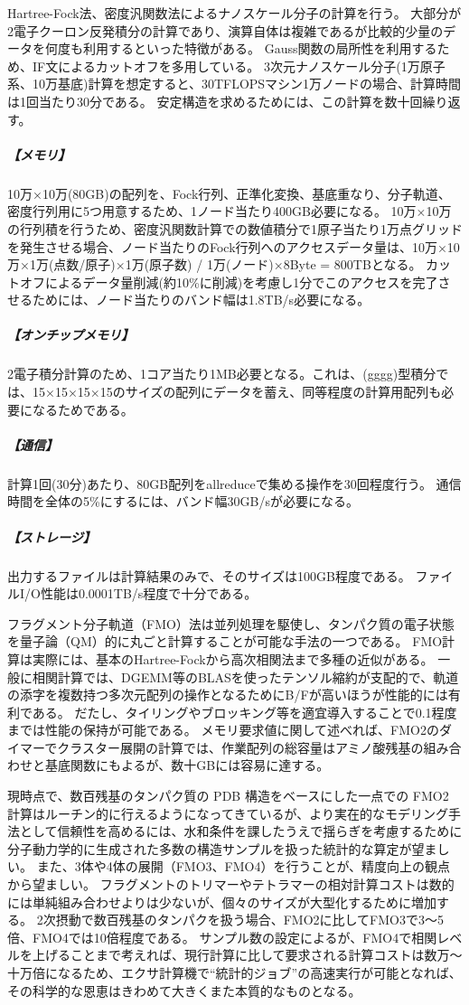 \label{sec:4-2_要求性能_大規模分子軌道法}
Hartree-Fock法、密度汎関数法によるナノスケール分子の計算を行う。
大部分が2電子クーロン反発積分の計算であり、演算自体は複雑であるが比較的少量のデータを何度も利用するといった特徴がある。
Gauss関数の局所性を利用するため、IF文によるカットオフを多用している。
3次元ナノスケール分子(1万原子系、10万基底)計算を想定すると、30TFLOPSマシン1万ノードの場合、計算時間は1回当たり30分である。
安定構造を求めるためには、この計算を数十回繰り返す。

\subparagraph{【メモリ】}
10万×10万(80GB)の配列を、Fock行列、正準化変換、基底重なり、分子軌道、密度行列用に5つ用意するため、1ノード当たり400GB必要になる。
10万×10万の行列積を行うため、密度汎関数計算での数値積分で1原子当たり1万点グリッドを発生させる場合、ノード当たりのFock行列へのアクセスデータ量は、10万×10万×1万(点数/原子)×1万(原子数) / 1万(ノード)×8Byte = 800TBとなる。
カットオフによるデータ量削減(約10\%に削減)を考慮し1分でこのアクセスを完了させるためには、ノード当たりのバンド幅は1.8TB/s必要になる。

\subparagraph{【オンチップメモリ】}
2電子積分計算のため、1コア当たり1MB必要となる。これは、(gg{\textbar}gg)型積分では、15×15×15×15のサイズの配列にデータを蓄え、同等程度の計算用配列も必要になるためである。

\subparagraph{【通信】}
計算1回(30分)あたり、80GB配列をallreduceで集める操作を30回程度行う。
通信時間を全体の5\%にするには、バンド幅30GB/sが必要になる。

\subparagraph{【ストレージ】}
出力するファイルは計算結果のみで、そのサイズは100GB程度である。
ファイルI/O性能は0.0001TB/s程度で十分である。


\label{sec:4-2_要求性能_FMO}
フラグメント分子軌道（FMO）法は並列処理を駆使し、タンパク質の電子状態を量子論（QM）的に丸ごと計算することが可能な手法の一つである。
FMO計算は実際には、基本のHartree-Fockから高次相関法まで多種の近似がある。
一般に相関計算では、DGEMM等のBLASを使ったテンソル縮約が支配的で、軌道の添字を複数持つ多次元配列の操作となるためにB/Fが高いほうが性能的には有利である。
だたし、タイリングやブロッキング等を適宜導入することで0.1程度までは性能の保持が可能である。
メモリ要求値に関して述べれば、FMO2のダイマーでクラスター展開の計算では、作業配列の総容量はアミノ酸残基の組み合わせと基底関数にもよるが、数十GBには容易に達する。

現時点で、数百残基のタンパク質の PDB 構造をベースにした一点での FMO2 計算はルーチン的に行えるようになってきているが、より実在的なモデリング手法として信頼性を高めるには、水和条件を課したうえで揺らぎを考慮するために分子動力学的に生成された多数の構造サンプルを扱った統計的な算定が望ましい。
また、3体や4体の展開（FMO3、FMO4）を行うことが、精度向上の観点から望ましい。
フラグメントのトリマーやテトラマーの相対計算コストは数的には単純組み合わせよりは少ないが、個々のサイズが大型化するために増加する。
2次摂動で数百残基のタンパクを扱う場合、FMO2に比してFMO3で3～5倍、FMO4では10倍程度である。
サンプル数の設定によるが、FMO4で相関レベルを上げることまで考えれば、現行計算に比して要求される計算コストは数万～十万倍になるため、エクサ計算機で“統計的ジョブ”の高速実行が可能となれば、その科学的な恩恵はきわめて大きくまた本質的なものとなる。

